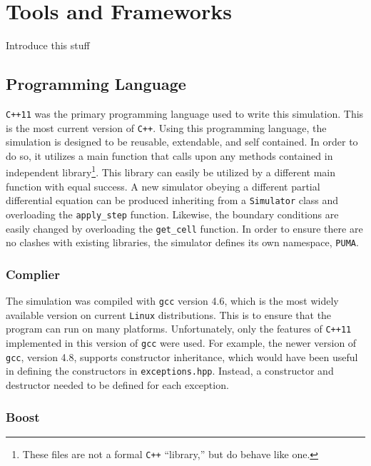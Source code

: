\documentclass[a4paper,11pt]{article}
\begin{document}
\section{Tools and Frameworks}

Introduce this stuff

\subsection{Programming Language}

\texttt{C++11} was the primary programming language used to write this simulation.  This is the most current version of \texttt{C++}.  Using this programming language, the simulation is designed to be  reusable, extendable, and self contained. In order to do so, it utilizes a main function that calls upon any methods contained in independent library\footnote{These files are not a formal \texttt{C++} ``library,'' but do behave like one.}.  This library can easily be utilized by a different main function with equal success.  A new simulator obeying a different partial differential equation can be produced inheriting from a \texttt{Simulator} class and overloading the \texttt{apply\_step} function.  Likewise, the boundary conditions are easily changed by overloading the \texttt{get\_cell} function.  In order to ensure there are no clashes with existing libraries, the simulator defines its own namespace, \texttt{PUMA}.   

\subsubsection{Complier}

The simulation was compiled with \texttt{gcc} version 4.6, which is the most widely available version on current \texttt{Linux} distributions.  This is to ensure that the program can run on many platforms.  Unfortunately, only the features of \texttt{C++11} implemented in this version of \texttt{gcc} were used.  For example, the newer version of \texttt{gcc}, version 4.8, supports constructor inheritance, which would have been useful in defining the constructors in \texttt{exceptions.hpp}.  Instead, a constructor and destructor needed to be defined for each exception. 


\subsubsection{Boost}
\end{document}
